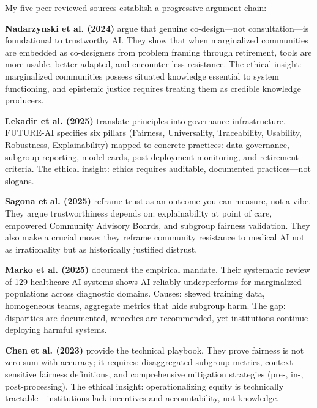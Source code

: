 \documentclass[12pt,a4paper]{article}
\begin{document}
My five peer-reviewed sources establish a progressive argument chain:

\textbf{Nadarzynski et al. (2024)} argue that genuine co-design—not consultation—is foundational to trustworthy AI. They show that when marginalized communities are embedded as co-designers from problem framing through retirement, tools are more usable, better adapted, and encounter less resistance. The ethical insight: marginalized communities possess situated knowledge essential to system functioning, and epistemic justice requires treating them as credible knowledge producers.\cite{nadarzynski2024}

\textbf{Lekadir et al. (2025)} translate principles into governance infrastructure. FUTURE-AI specifies six pillars (Fairness, Universality, Traceability, Usability, Robustness, Explainability) mapped to concrete practices: data governance, subgroup reporting, model cards, post-deployment monitoring, and retirement criteria. The ethical insight: ethics requires auditable, documented practices—not slogans.\cite{lekadir2025}

\textbf{Sagona et al. (2025)} reframe trust as an outcome you can measure, not a vibe. They argue trustworthiness depends on: explainability at point of care, empowered Community Advisory Boards, and subgroup fairness validation. They also make a crucial move: they reframe community resistance to medical AI not as irrationality but as historically justified distrust.\cite{sagona2025}

\textbf{Marko et al. (2025)} document the empirical mandate. Their systematic review of 129 healthcare AI systems shows AI reliably underperforms for marginalized populations across diagnostic domains. Causes: skewed training data, homogeneous teams, aggregate metrics that hide subgroup harm. The gap: disparities are documented, remedies are recommended, yet institutions continue deploying harmful systems.\cite{marko2025}

\textbf{Chen et al. (2023)} provide the technical playbook. They prove fairness is not zero-sum with accuracy; it requires: disaggregated subgroup metrics, context-sensitive fairness definitions, and comprehensive mitigation strategies (pre-, in-, post-processing). The ethical insight: operationalizing equity is technically tractable—institutions lack incentives and accountability, not knowledge.\cite{chen2023}

\begin{tcolorbox}[colback=questionbg,colframe=questionborder,title=\textbf{GUIDING QUESTION:} What's your take on their positions?]
\end{tcolorbox}
\end{document}
